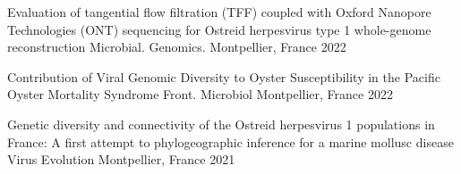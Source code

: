 



\begin{cvhonors}

  \cvhonor
    {Evaluation of tangential flow filtration (TFF) coupled with Oxford Nanopore Technologies (ONT) sequencing for Ostreid herpesvirus type 1 whole-genome reconstruction} %
    {Microbial. Genomics.} %
    {Montpellier, France} %
    {2022} %
 
  \cvhonor
    {Contribution of Viral Genomic Diversity to Oyster Susceptibility in the Pacific Oyster Mortality Syndrome} %
    {Front. Microbiol} %
    {Montpellier, France} %
    {2022} %

  \cvhonor
    {Genetic diversity and connectivity of the Ostreid herpesvirus 1 populations in France: A first attempt to phylogeographic inference for a marine mollusc disease} %
    {Virus Evolution} %
    {Montpellier, France} %
    {2021} %

\end{cvhonors}

